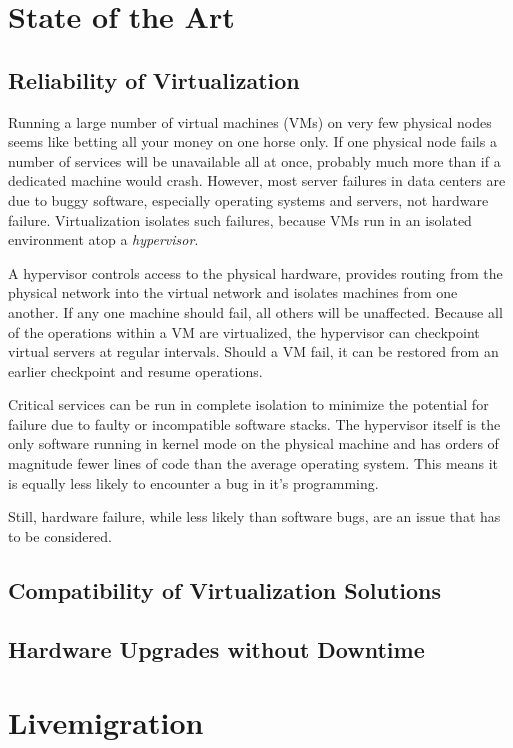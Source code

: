 \documentclass{scrartcl}
\begin{document}
\section{State of the Art}
\subsection{Reliability of Virtualization}
\label{sec:sota}

Running a large number of virtual machines (VMs) on very few physical
nodes seems like betting all your money on one horse only. If one
physical node fails a number of services will be unavailable all at
once, probably much more than if a dedicated machine would
crash. However, most server failures in data centers are due to buggy
software, especially operating systems and servers, not hardware
failure. Virtualization isolates such failures, because VMs run in an
isolated environment atop a \emph{hypervisor}.

A hypervisor controls access to the physical hardware, provides
routing from the physical network into the virtual network and
isolates machines from one another. If any one machine should fail,
all others will be unaffected. Because all of the operations within a
VM are virtualized, the hypervisor can checkpoint virtual servers at
regular intervals. Should a VM fail, it can be restored from an
earlier checkpoint and resume operations.

Critical services can be run in complete isolation to minimize the
potential for failure due to faulty or incompatible software
stacks. The hypervisor itself is the only software running in kernel
mode on the physical machine and has orders of magnitude fewer lines
of code than the average operating system. This means it is equally
less likely to encounter a bug in it's programming.

Still, hardware failure, while less likely than software bugs, are an
issue that has to be considered.

\subsection{Compatibility of Virtualization Solutions}

\subsection{Hardware Upgrades without Downtime}

\section{Livemigration}
\label{sec:livemigration}
\end{document}
